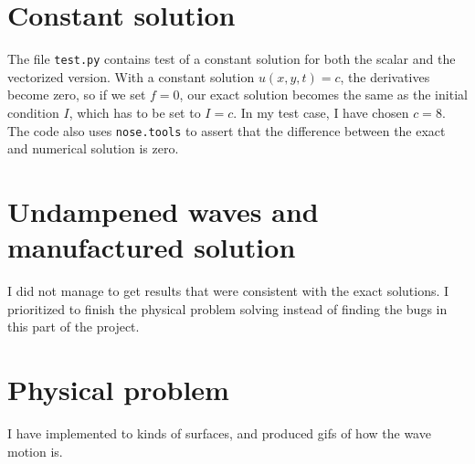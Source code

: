 \documentclass[10pt, a4paper]{amsart}
\numberwithin{figure}{section}
\numberwithin{table}{section}
\begin{document}
\section{Constant solution}

The file \texttt{test.py} contains test of a constant solution for both the
scalar and the vectorized version. With a constant solution $u(x,y,t) = c$, the derivatives
become zero, so if we set $f = 0$, our exact solution becomes the same as the
initial condition $I$, which has to be set to $I=c$. In my test case, I have
chosen $c=8$. The code also uses \texttt{nose.tools} to assert that the
difference between the exact and numerical solution is zero.


\section{Undampened waves and manufactured solution}

I did not manage to get results that were consistent with the exact solutions.
I prioritized to finish the physical problem solving instead of finding the
bugs in this part of the project.

\section{Physical problem}

I have implemented to kinds of surfaces, and produced gifs of how the wave
motion is.
\end{document}
